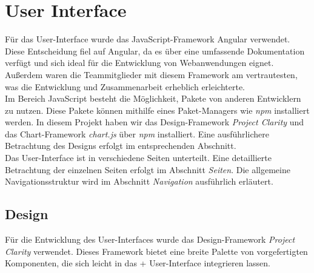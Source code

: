 \section{User Interface}

Für das User-Interface wurde das JavaScript-Framework Angular verwendet. 
Diese Entscheidung fiel auf Angular, da es über eine umfassende Dokumentation verfügt und 
sich ideal für die Entwicklung von Webanwendungen eignet. Außerdem waren die 
Teammitglieder mit diesem Framework am vertrautesten, was die Entwicklung und Zusammenarbeit 
erheblich erleichterte. \\

\noindent Im Bereich JavaScript besteht die Möglichkeit, Pakete von anderen Entwicklern zu nutzen. 
Diese Pakete können mithilfe eines Paket-Managers wie \textit{npm} installiert werden. 
In diesem Projekt haben wir das Design-Framework \textit{Project Clarity} und das 
Chart-Framework \textit{chart.js} über \textit{npm} installiert. Eine ausführlichere Betrachtung des 
Designs erfolgt im entsprechenden Abschnitt. \\

\noindent Das User-Interface ist in verschiedene Seiten unterteilt. Eine detaillierte Betrachtung der 
einzelnen Seiten erfolgt im Abschnitt \textit{Seiten}. Die allgemeine Navigationsstruktur wird im 
Abschnitt \textit{Navigation} ausführlich erläutert.


\subsection{Design}

Für die Entwicklung des User-Interfaces wurde das Design-Framework \textit{Project Clarity} verwendet. 
Dieses Framework bietet eine breite Palette von vorgefertigten Komponenten, die sich leicht in das +
User-Interface integrieren lassen.


